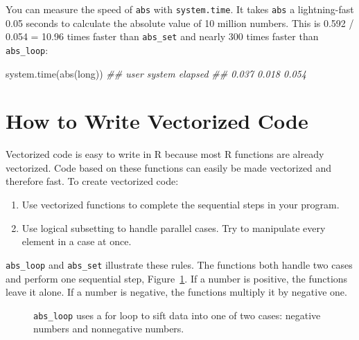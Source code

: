 \documentclass[
  letterpaper,
  DIV=11,
  numbers=noendperiod]{scrbook}
\makeatletter
\newenvironment{Shaded}{\begin{snugshade}}{\end{snugshade}}
\newcommand{\DocumentationTok}[1]{\textcolor[rgb]{0.37,0.37,0.37}{\textit{#1}}}
\newcommand{\FunctionTok}[1]{\textcolor[rgb]{0.28,0.35,0.67}{#1}}
\newcommand{\NormalTok}[1]{\textcolor[rgb]{0.00,0.23,0.31}{#1}}
\newcommand*\pandocbounded[1]{%
  \sbox\pandoc@box{#1}%
  \Gscale@div\@tempa{\textheight}{\dimexpr\ht\pandoc@box+\dp\pandoc@box\relax}%
  \Gscale@div\@tempb{\linewidth}{\wd\pandoc@box}%
  \ifdim\@tempb\p@<\@tempa\p@\let\@tempa\@tempb\fi%
  \ifdim\@tempa\p@<\p@\scalebox{\@tempa}{\usebox\pandoc@box}%
  \else\usebox{\pandoc@box}%
  \fi%
}
\providecommand{\tightlist}{%
  \setlength{\itemsep}{0pt}\setlength{\parskip}{0pt}}
\makeatother
\begin{document}
You can measure the speed of \texttt{abs} with \texttt{system.time}. It
takes \texttt{abs} a lightning-fast 0.05 seconds to calculate the
absolute value of 10 million numbers. This is 0.592 / 0.054 = 10.96
times faster than \texttt{abs\_set} and nearly 300 times faster than
\texttt{abs\_loop}:

\begin{Shaded}
\begin{Highlighting}[]
\FunctionTok{system.time}\NormalTok{(}\FunctionTok{abs}\NormalTok{(long))}
\DocumentationTok{\#\#   user  system elapsed }
\DocumentationTok{\#\#  0.037   0.018   0.054}
\end{Highlighting}
\end{Shaded}

\section{How to Write Vectorized
Code}\label{how-to-write-vectorized-code}

Vectorized code is easy to write in R because most R functions are
already vectorized. Code based on these functions can easily be made
vectorized and therefore fast. To create vectorized code:

\begin{enumerate}
\def\labelenumi{\arabic{enumi}.}
\tightlist
\item
  Use vectorized functions to complete the sequential steps in your
  program.
\item
  Use logical subsetting to handle parallel cases. Try to manipulate
  every element in a case at once.
\end{enumerate}

\texttt{abs\_loop} and \texttt{abs\_set} illustrate these rules. The
functions both handle two cases and perform one sequential step,
Figure~\ref{fig-abs}. If a number is positive, the functions leave it
alone. If a number is negative, the functions multiply it by negative
one.

\begin{figure}

\centering{

\pandocbounded{\texttt{[image: images/hopr\_1001.png]}}

}

\caption{\label{fig-abs}\texttt{abs\_loop} uses a for loop to sift data
into one of two cases: negative numbers and nonnegative numbers.}

\end{figure}%
\end{document}
